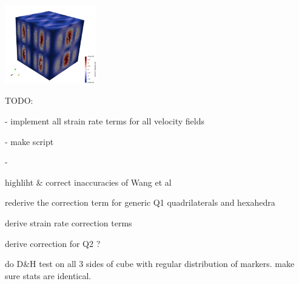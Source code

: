 \begin{itemize}
\includegraphics[width=4cm]{python_codes/fieldstone_31/velfield4}

\end{itemize}




TODO:

- implement all strain rate terms for all velocity fields

- make script  

- 

highliht \& correct inaccuracies of Wang et al

rederive the correction term for generic Q1 quadrilaterals and hexahedra

derive strain rate correction terms

derive correction for Q2 ?

do D\&H test on all 3 sides of cube with regular distribution of markers. make sure stats are identical.

